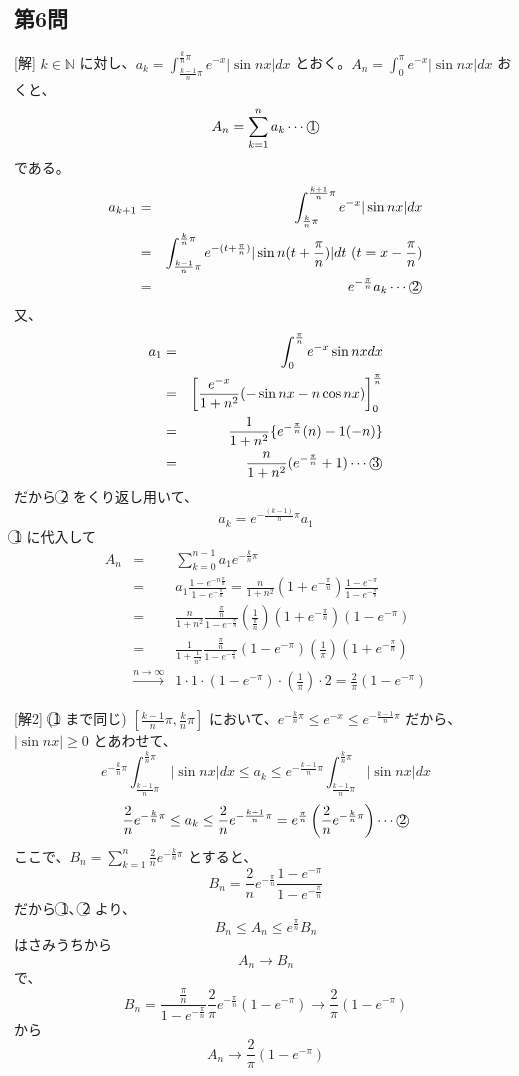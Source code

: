 \documentclass[../main.tex]{subfiles}
\begin{document}
\subsection*{第6問}
[解] $k \in \mathbb{N}$ に対し、$a_k = \int_{\frac{k-1}{n}\pi}^{\frac{k}{n}\pi} e^{-x} |\sin nx| dx$ とおく。$A_n = \int_0^\pi e^{-x} |\sin nx| dx$
おくと、
\[ A_n = \sum_{k=1}^n a_k \cdots \text{\textcircled{1}} \]
である。
\begin{eqnarray*}
  a_{k+1} &=& \int_{\frac{k}{n}\pi}^{\frac{k+1}{n}\pi} e^{-x} |\sin nx| dx \\
  &=& \int_{\frac{k-1}{n}\pi}^{\frac{k}{n}\pi} e^{-(t+\frac{\pi}{n})} |\sin n(t+\frac{\pi}{n})| dt\ (t = x - \frac{\pi}{n}) \\
  &=& e^{-\frac{\pi}{n}} a_k \cdots \text{\textcircled{2}}
\end{eqnarray*}
又、
\begin{eqnarray*}
  a_1 &=& \int_0^{\frac{\pi}{n}} e^{-x} \sin nx dx \\
  &=& \left[ \frac{e^{-x}}{1+n^2} (-\sin nx - n \cos nx) \right]_0^{\frac{\pi}{n}} \\
  &=& \frac{1}{1+n^2} \{ e^{-\frac{\pi}{n}} (n) - 1(-n) \} \\
  &=& \frac{n}{1+n^2} (e^{-\frac{\pi}{n}} + 1) \cdots \text{\textcircled{3}}
\end{eqnarray*}
だから \textcircled{2} をくり返し用いて、
\[ a_k = e^{-\frac{(k-1)}{n}\pi} a_1 \]
\textcircled{1} に代入して
\begin{eqnarray*}
  A_n &=& \sum_{k=0}^{n-1} a_1 e^{-\frac{k}{n}\pi} \\
  &=& a_1 \frac{1-e^{-n \frac{\pi}{n}}}{1-e^{-\frac{\pi}{n}}} = \frac{n}{1+n^2} (1+e^{-\frac{\pi}{n}}) \frac{1-e^{-\pi}}{1-e^{-\frac{\pi}{n}}} \\
  &=& \frac{n}{1+n^2} \frac{\frac{\pi}{n}}{1-e^{-\frac{\pi}{n}}} \left(\frac{1}{\frac{\pi}{n}}\right) (1+e^{-\frac{\pi}{n}})(1-e^{-\pi}) \\
  &=& \frac{1}{1+\frac{1}{n^2}} \frac{\frac{\pi}{n}}{1-e^{-\frac{\pi}{n}}} (1-e^{-\pi}) \left(\frac{1}{\pi}\right) (1+e^{-\frac{\pi}{n}}) \\
  &\xrightarrow{n\to\infty}& 1 \cdot 1 \cdot (1-e^{-\pi}) \cdot \left(\frac{1}{\pi}\right) \cdot 2 = \frac{2}{\pi}(1-e^{-\pi})
\end{eqnarray*}

[解2] (\textcircled{1} まで同じ)
$[\frac{k-1}{n}\pi, \frac{k}{n}\pi]$ において、$e^{-\frac{k}{n}\pi} \le e^{-x} \le e^{-\frac{k-1}{n}\pi}$ だから、$|\sin nx| \ge 0$ とあわせて、
\[ e^{-\frac{k}{n}\pi} \int_{\frac{k-1}{n}\pi}^{\frac{k}{n}\pi} |\sin nx| dx \le a_k \le e^{-\frac{k-1}{n}\pi} \int_{\frac{k-1}{n}\pi}^{\frac{k}{n}\pi} |\sin nx| dx \]
\[ \frac{2}{n} e^{-\frac{k}{n}\pi} \le a_k \le \frac{2}{n} e^{-\frac{k-1}{n}\pi} = e^{\frac{\pi}{n}} \left( \frac{2}{n} e^{-\frac{k}{n}\pi} \right) \cdots \text{\textcircled{2}} \]
ここで、$B_n = \sum_{k=1}^n \frac{2}{n} e^{-\frac{k}{n}\pi}$ とすると、
\[ B_n = \frac{2}{n} e^{-\frac{\pi}{n}} \frac{1-e^{-\pi}}{1-e^{-\frac{\pi}{n}}} \]
だから \textcircled{1}、\textcircled{2} より、
\[ B_n \le A_n \le e^{\frac{\pi}{n}} B_n \]
はさみうちから
\[ A_n \to B_n \]
で、
\[ B_n = \frac{\frac{\pi}{n}}{1-e^{-\frac{\pi}{n}}} \frac{2}{\pi} e^{-\frac{\pi}{n}} (1-e^{-\pi}) \to \frac{2}{\pi}(1-e^{-\pi}) \]
から
\[ A_n \to \frac{2}{\pi}(1-e^{-\pi}) \]
\end{document}
